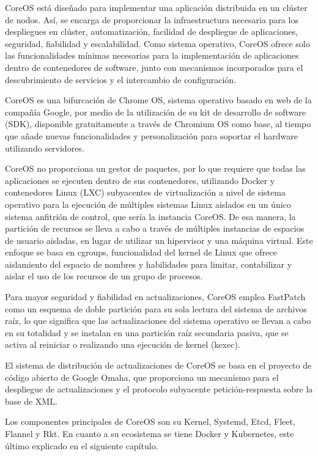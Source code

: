 CoreOS está diseñado para implementar una aplicación distribuida en un clúster de nodos. Así, se encarga de proporcionar la infraestructura necesaria para los despliegues en clúster, automatización, facilidad de despliegue de aplicaciones, seguridad, fiabilidad y escalabilidad. Como sistema operativo, CoreOS ofrece solo las funcionalidades mínimas necesarias para la implementación de aplicaciones dentro de contenedores de software, junto con mecanismos incorporados para el descubrimiento de servicios y el intercambio de configuración.

CoreOS es una bifurcación de Chrome OS, sistema operativo basado en web de la compañía Google, por medio de la utilización de su kit de desarrollo de software (SDK), disponible gratuitamente a través de Chromium OS como base, al tiempo que añade nuevas funcionalidades y personalización para soportar el hardware utilizando servidores.

CoreOS no proporciona un gestor de paquetes, por lo que requiere que todas las aplicaciones se ejecuten dentro de sus contenedores, utilizando Docker y contenedores Linux (LXC) subyacentes de virtualización a nivel de sistema operativo para la ejecución de múltiples sistemas Linux aislados en un único sistema anfitrión de control, que sería la instancia CoreOS. De esa manera, la partición de recursos se lleva a cabo a través de múltiples instancias de espacios de usuario aisladas, en lugar de utilizar un hipervisor y una máquina virtual. Este enfoque se basa en cgroups, funcionalidad del kernel de Linux que ofrece aislamiento del espacio de nombres y habilidades para limitar, contabilizar y aislar el uso de los recursos de un grupo de procesos.

Para mayor seguridad y fiabilidad en actualizaciones, CoreOS emplea FastPatch como un esquema de doble partición para su sola lectura del sistema de archivos raíz, lo que significa que las actualizaciones del sistema operativo se llevan a cabo en su totalidad y se instalan en una partición raíz secundaria pasiva, que se activa al reiniciar o realizando una ejecución de kernel (kexec).

El sistema de distribución de actualizaciones de CoreOS se basa en el proyecto de código abierto de Google Omaha, que proporciona un mecanismo para el despliegue de actualizaciones y el protocolo subyacente petición-respuesta sobre la base de XML.

Los componentes principales de CoreOS son su Kernel, Systemd, Etcd, Fleet, Flannel y Rkt. En cuanto a su ecosistema se tiene Docker y Kubernetes, este último explicado en el siguiente capítulo.

